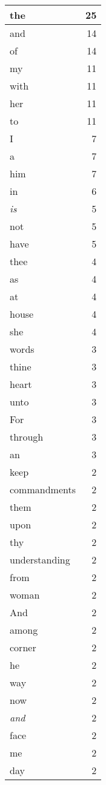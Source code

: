 \begin{center}
\begin{longtable}{l|r}
the & 25\\ \hline 
and & 14\\ \hline 
of & 14\\ \hline 
my & 11\\ \hline 
with & 11\\ \hline 
her & 11\\ \hline 
to & 11\\ \hline 
I & 7\\ \hline 
a & 7\\ \hline 
him & 7\\ \hline 
in & 6\\ \hline 
\emph{is} & 5\\ \hline 
not & 5\\ \hline 
have & 5\\ \hline 
thee & 4\\ \hline 
as & 4\\ \hline 
at & 4\\ \hline 
house & 4\\ \hline 
she & 4\\ \hline 
words & 3\\ \hline 
thine & 3\\ \hline 
heart & 3\\ \hline 
unto & 3\\ \hline 
For & 3\\ \hline 
through & 3\\ \hline 
an & 3\\ \hline 
keep & 2\\ \hline 
commandments & 2\\ \hline 
them & 2\\ \hline 
upon & 2\\ \hline 
thy & 2\\ \hline 
understanding & 2\\ \hline 
from & 2\\ \hline 
woman & 2\\ \hline 
And & 2\\ \hline 
among & 2\\ \hline 
corner & 2\\ \hline 
he & 2\\ \hline 
way & 2\\ \hline 
now & 2\\ \hline 
\emph{and} & 2\\ \hline 
face & 2\\ \hline 
me & 2\\ \hline 
day & 2\\ \hline 

\end{longtable}
\end{center}
